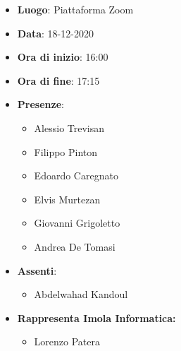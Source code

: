 \begin{itemize}
    \item \textbf{Luogo}: Piattaforma Zoom
    \item \textbf{Data}: 18-12-2020
    \item \textbf{Ora di inizio}: 16:00
    \item \textbf{Ora di fine}: 17:15
    \item \textbf{Presenze}:
          \begin{itemize}
              \item Alessio Trevisan
              \item Filippo Pinton
              \item Edoardo Caregnato
              \item Elvis Murtezan
              \item Giovanni Grigoletto
              \item Andrea De Tomasi
          \end{itemize}
     \item \textbf{Assenti}:
    	     \begin{itemize}
              	\item Abdelwahad Kandoul
	\end{itemize}
	\item \textbf{Rappresenta Imola Informatica:}
	\begin{itemize}
		\item Lorenzo Patera
	\end{itemize}
\end{itemize}